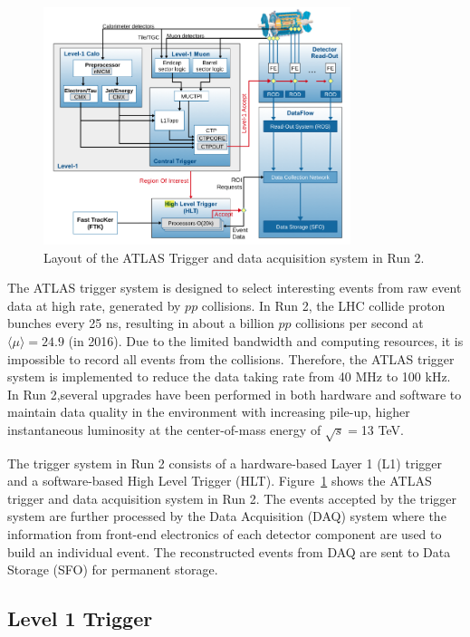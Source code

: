 \begin{figure}[!htb]
    \includegraphics[width=0.8\textwidth]{figures/tdaq.png}
    \centering
    \caption{Layout of the ATLAS Trigger and data acquisition system in Run 2.}
    \label{fig:tdaq}
\end{figure}

The ATLAS trigger system is designed to select interesting events from raw event data at high rate, generated by $pp$ collisions. In Run 2, the LHC collide proton bunches every 25 \si{\nano\second}, resulting in about a billion $pp$ collisions per second at $\langle\mu\rangle = 24.9$ (in 2016). Due to the limited bandwidth and computing resources, it is impossible to record all events from the collisions. Therefore, the ATLAS trigger system is implemented to reduce the data taking rate from 40 \si{\mega\hertz} to 100 \si{\kilo\hertz}. In Run 2,several upgrades have been performed in both hardware and software to maintain data quality in the environment with increasing pile-up, higher instantaneous luminosity at the center-of-mass energy of $\sqrt{s}=$13 TeV.

The trigger system in Run 2 consists of a hardware-based Layer 1 (L1) trigger and a software-based High Level Trigger (HLT). Figure~\ref{fig:tdaq} shows the ATLAS trigger and data acquisition system in Run 2. The events accepted by the trigger system are further processed by the Data Acquisition (DAQ) system where the information from front-end electronics of each detector component are used to build an individual event. The reconstructed events from DAQ are sent to Data Storage (SFO) for permanent storage.



\subsection{Level 1 Trigger}
\label{sec:atlas:l1trigger}

